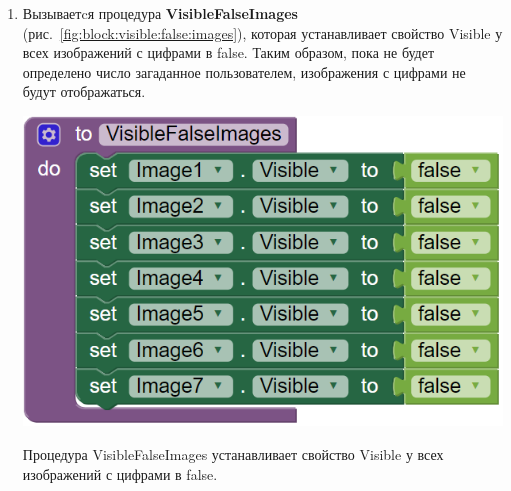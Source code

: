\begin{enumerate}
  \item Вызываетcя процедура \textbf{VisibleFalseImages} (рис.~\ref{fig:block:visible:false:images}), которая устанавливает свойство Visible у всех изображений с цифрами в false. Таким образом, пока не будет определено число загаданное пользователем, изображения с цифрами не будут отображаться.
  \begin{marginfigure}[-2em]
    \includegraphics{./graphics/programs/guess_numbers/procedure_visibleFalseImages_AppInventor_2018.png}
      \caption[Процедура VisibleFalseImages.]{Процедура VisibleFalseImages устанавливает свойство Visible у всех изображений с цифрами в false.}
    \label{fig:block:visible:false:images}
  \end{marginfigure}


\end{enumerate}
